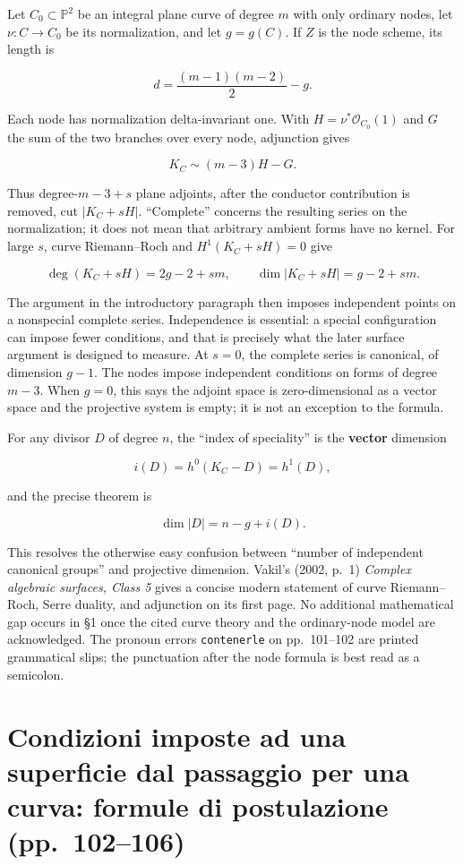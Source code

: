 Let \(C_0\subset\mathbb P^2\) be an integral plane curve of degree \(m\) with only ordinary nodes, let \(\nu:C\to C_0\) be its normalization, and let \(g=g(C)\). If \(Z\) is the node scheme, its length is

\[
 d=\frac{(m-1)(m-2)}2-g.
\]

Each node has normalization delta-invariant one. With \(H=\nu^*\mathcal O_{C_0}(1)\) and \(G\) the sum of the two branches over every node, adjunction gives

\[
 K_C\sim(m-3)H-G.
\]

Thus degree-\(m-3+s\) plane adjoints, after the conductor contribution is removed, cut \(|K_C+sH|\). ``Complete'' concerns the resulting series on the normalization; it does not mean that arbitrary ambient forms have no kernel. For large \(s\), curve Riemann--Roch and \(H^1(K_C+sH)=0\) give

\[
 \deg(K_C+sH)=2g-2+sm,
 \qquad \dim|K_C+sH|=g-2+sm.
\]

The argument in the introductory paragraph then imposes independent points on a nonspecial complete series. Independence is essential: a special configuration can impose fewer conditions, and that is precisely what the later surface argument is designed to measure. At \(s=0\), the complete series is canonical, of dimension \(g-1\). The nodes impose independent conditions on forms of degree \(m-3\). When \(g=0\), this says the adjoint space is zero-dimensional as a vector space and the projective system is empty; it is not an exception to the formula.

For any divisor \(D\) of degree \(n\), the ``index of speciality'' is the \textbf{vector} dimension

\[
 i(D)=h^0(K_C-D)=h^1(D),
\]

and the precise theorem is

\[
 \dim|D|=n-g+i(D).
\]

This resolves the otherwise easy confusion between ``number of independent canonical groups'' and projective dimension. Vakil's (2002, p.~1) \emph{Complex algebraic surfaces, Class 5} gives a concise modern statement of curve Riemann--Roch, Serre duality, and adjunction on its first page. No additional mathematical gap occurs in §1 once the cited curve theory and the ordinary-node model are acknowledged. The pronoun errors \texttt{contenerle} on pp.~101--102 are printed grammatical slips; the punctuation after the node formula is best read as a semicolon.

\section[Formule di postulazione]{Condizioni imposte ad una superficie dal passaggio per una curva: formule di postulazione (pp.~102--106)}\label{enriques-iv-2}

